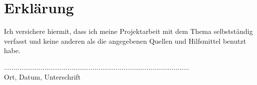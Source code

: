 \section*{Erklärung}
Ich versichere hiermit, dass ich meine Projektarbeit mit
dem Thema 
\textbf{\thetitle} selbstständig verfasst und keine anderen als die
angegebenen Quellen und Hilfsmittel benutzt habe.

\vspace{3cm}
................................................................................................\\
Ort, Datum, Unterschrift

